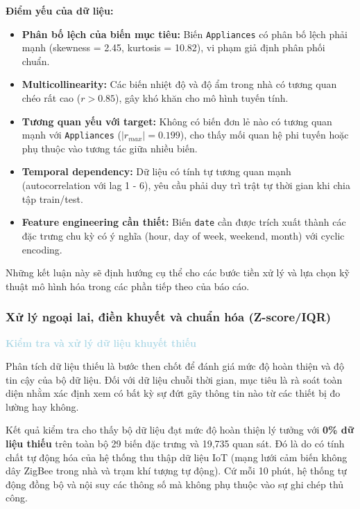 \textbf{Điểm yếu của dữ liệu:}
\begin{itemize} [labelsep=10pt, leftmargin=2cm]
    \item \textbf{Phân bố lệch của biến mục tiêu:} Biến \texttt{Appliances} có phân bố lệch phải mạnh (skewness = 2.45, kurtosis = 10.82), vi phạm giả định phân phối chuẩn. 
    
    \item \textbf{Multicollinearity:} Các biến nhiệt độ và độ ẩm trong nhà có tương quan chéo rất cao ($r > 0.85$), gây khó khăn cho mô hình tuyến tính. 
    
    \item \textbf{Tương quan yếu với target:} Không có biến đơn lẻ nào có tương quan mạnh với \texttt{Appliances} ($|r_{max}| = 0.199$), cho thấy mối quan hệ phi tuyến hoặc phụ thuộc vào tương tác giữa nhiều biến. 
    
    \item \textbf{Temporal dependency:} Dữ liệu có tính tự tương quan mạnh (autocorrelation với lag 1 - 6), yêu cầu phải duy trì trật tự thời gian khi chia tập train/test. 
    
    \item \textbf{Feature engineering cần thiết:} Biến \texttt{date} cần được trích xuất thành các đặc trưng chu kỳ có ý nghĩa (hour, day of week, weekend, month) với cyclic encoding. 
\end{itemize}

Những kết luận này sẽ định hướng cụ thể cho các bước tiền xử lý và lựa chọn kỹ thuật mô hình hóa trong các phần tiếp theo của báo cáo. 


\subsubsection{Xử lý ngoại lai, điền khuyết và chuẩn hóa (Z-score/IQR)}

\vspace{0.5em}
\noindent\textcolor{lightblue}{\textbf{Kiểm tra và xử lý dữ liệu khuyết thiếu}}
\vspace{0.5em}

Phân tích dữ liệu thiếu là bước then chốt để đánh giá mức độ hoàn thiện và độ tin cậy của bộ dữ liệu. Đối với dữ liệu chuỗi thời gian, mục tiêu là rà soát toàn diện nhằm xác định xem có bất kỳ sự đứt gãy thông tin nào từ các thiết bị đo lường hay không.

Kết quả kiểm tra cho thấy bộ dữ liệu đạt mức độ hoàn thiện lý tưởng với \textbf{0\% dữ liệu thiếu} trên toàn bộ 29 biến đặc trưng và 19,735 quan sát. Đó là do có tính chất tự động hóa của hệ thống thu thập dữ liệu IoT (mạng lưới cảm biến không dây ZigBee trong nhà và trạm khí tượng tự động). Cứ mỗi 10 phút, hệ thống tự động đồng bộ và nội suy các thông số mà không phụ thuộc vào sự ghi chép thủ công.

